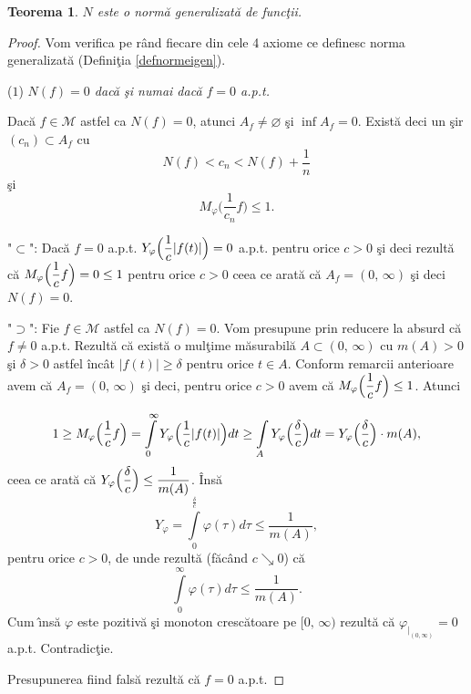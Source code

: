 \documentclass[ a4paper, 12pt]{report}
\newtheorem{theorem}{\bf Teorema}[section]
\theoremstyle{definition}
\theoremstyle{remark}
\numberwithin{equation}{section}
\begin{document}
\begin{theorem}
$N$ este o norm\u a generalizat\u a de func\c tii.
\end{theorem}
\begin{proof} Vom verifica pe r\^ and fiecare din cele 4 axiome ce definesc norma generalizat\u a (Defini\c tia \ref{defnormeigen}).

\smallskip

($1$) {\it $N(f) = 0$ dac\u a \c si numai dac\u a $f = 0$ a.p.t.}

\smallskip

Dac\u a $f \in \mathcal{M}$ astfel ca $N(f) = 0$, atunci $A_f \neq \varnothing$ \c si $\inf A_f = 0$. Exist\u a deci un \c sir $(c_n) \subset A_f$ cu
$$N(f) < c_n < N(f)+ \frac{1}{n}$$ \c si $$M_\varphi \Big(\frac{1}{c_n}f\Big) \leq 1.$$

"$\subset$": Dac\u a $f = 0$ a.p.t. $Y_\varphi \Big(\displaystyle\frac{1}{c} \lvert f(t) \rvert\Big) = 0$ a.p.t. pentru orice $c > 0$ \c si deci rezult\u a c\u a $ M_\varphi \Big(\displaystyle\frac{1}{c}f\Big) = 0 \leq 1$ pentru orice $c > 0$ ceea ce arat\u a c\u a $A_f = (0,\, \infty)$ \c si deci $N(f) = 0$.

"$\supset$": Fie $f \in \mathcal{M}$ astfel ca $N(f) = 0$. Vom presupune prin reducere la absurd c\u a $f \neq 0$ a.p.t. Rezult\u a c\u a exist\u a o mul\c time m\u asurabil\u a $A \subset (0, \, \infty)$ cu $m(A) > 0$ \c si $\delta>0$ astfel \^inc\^at $\lvert f(t)\rvert \geq \delta$ pentru orice $t \in A$. Conform remarcii anterioare avem c\u a $A_f = (0,\, \infty)$ \c si deci, pentru orice $c > 0$ avem c\u a $M_\varphi \Big(\displaystyle\frac{1}{c}f\Big)\leq 1$. Atunci

$$1\geq M_\varphi \Big(\displaystyle\frac{1}{c}f\Big) = \int\limits_{0}^{\infty}Y_\varphi \Big(\displaystyle\frac{1}{c}\lvert f(t) \rvert\Big)dt \geq \int\limits_A Y_\varphi\Big(\displaystyle\frac{\delta}{c}\Big)dt = Y_\varphi \Big(\displaystyle\frac{\delta}{c}\Big)\cdot m(A),$$
ceea ce arat\u a c\u a $Y_\varphi\Big (\displaystyle\frac{\delta}{c}\Big)\leq \displaystyle\frac{1}{m(A)}$. \^Ins\u a
$$Y_\varphi = \int\limits_{0}^{\frac{\delta}{c}} \varphi(\tau) d\tau \leq \frac{1}{m(A)},$$
pentru orice $c>0$, de unde rezult\u a (f\u ac\^ and $c \searrow 0$) c\u a
$$ \int\limits_{0}^{\infty}\varphi(\tau)d\tau \leq \frac{1}{m(A)}.$$
Cum \^\i ns\u a $\varphi$ este pozitiv\u  a \c si monoton cresc\u atoare pe $[0, \, \infty)$ rezult\u a c\u a $ \varphi_{|_{(0,\infty)}} = 0$ a.p.t. Contradic\c tie.

Presupunerea fiind fals\u a  rezult\u a c\u a $f =0$ a.p.t.

\smallskip


\end{proof}
\end{document}
